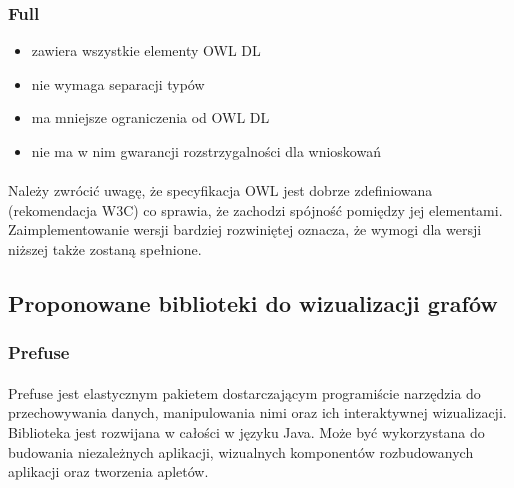 \documentclass[a4paper,10pt]{article}
\begin{document}
\subsubsection{Full}
	\begin{itemize}
	\item zawiera wszystkie elementy OWL DL 
	\item nie wymaga separacji typów
	\item ma mniejsze ograniczenia od OWL DL
	\item nie ma w nim gwarancji rozstrzygalności dla wnioskowań
	\end{itemize}

\paragraph{} Należy zwrócić uwagę, że specyfikacja OWL jest dobrze zdefiniowana (rekomendacja W3C\cite{specyfikacjaW3C}) co sprawia, że zachodzi spójność pomiędzy jej elementami. Zaimplementowanie wersji bardziej rozwiniętej oznacza, że wymogi dla wersji niższej także zostaną spełnione.


\subsection{Proponowane biblioteki do wizualizacji grafów}
\subsubsection{Prefuse}

\paragraph{} Prefuse jest elastycznym pakietem dostarczającym programiście narzędzia do przechowywania danych, manipulowania nimi oraz ich interaktywnej wizualizacji. Biblioteka jest rozwijana w całości w języku Java. Może być wykorzystana do budowania niezależnych aplikacji, wizualnych komponentów rozbudowanych aplikacji oraz tworzenia apletów. 
\end{document}
